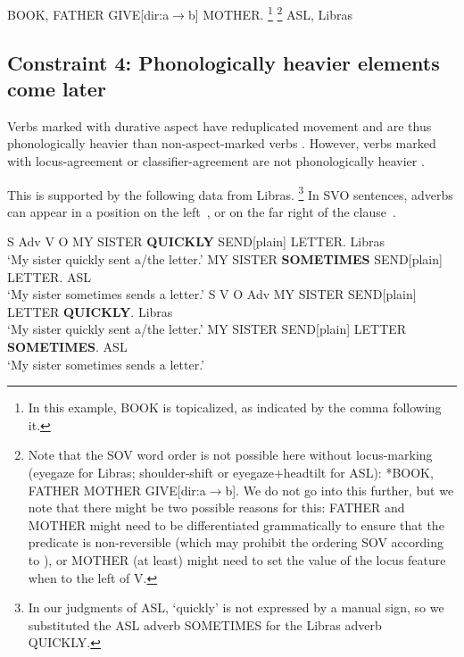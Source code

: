 \documentclass[output=paper,colorlinks,citecolor=brown,
]{langscibook}
\newcommand{\laszDir}[2]{[dir:#1$\to$#2]}
\newcommand{\laszPlain}[0]{[plain]}
\begin{document}
\ea 
    \label{lasz:ex:12}
    BOOK, FATHER GIVE\laszDir{a}{b} MOTHER.%
    \footnote{
        In this example, BOOK is topicalized, as indicated by the comma
        following it.
    }%
    \footnote{
        Note that the SOV word order is not possible here without locus-marking
        (eyegaze for Libras; shoulder-shift or eyegaze+headtilt for ASL):
        \ea 
            *BOOK, FATHER MOTHER GIVE\laszDir{a}{b}.
        \z 
        We do not go into this further, but we note that there might be two possible reasons
        for this: FATHER and MOTHER might need to be differentiated grammatically to
        ensure that the predicate is non-reversible (which may prohibit the ordering SOV
        according to \citealp{Fischer.1974}), or MOTHER (at least) might need to set the value of the
        locus feature when to the left of V.
    }
    \hfill 
    \cmark ASL,
    \cmark Libras 
    \\
\z 

\subsection*{Constraint 4: Phonologically heavier elements come later}

Verbs marked with durative aspect have reduplicated movement
\citep{Klima.Bellugi.1979} and are thus phonologically heavier than
non-aspect-marked verbs \citep{Brentari.1998}. However, verbs marked
with locus-agreement or classifier-agreement are not phonologically
heavier \citep{Brentari.1998}.

This is supported by the following data from Libras.%
\footnote{
    In our judgments of ASL, `quickly' is not expressed by a manual sign, so
    we substituted the ASL adverb SOMETIMES for the Libras adverb QUICKLY.
}
In SVO sentences, adverbs can appear in a position on the left~, or on the
far right of the clause~.

\ea 
    \label{lasz:ex:13}
     S Adv V O
    \ea 
        MY SISTER \textbf{QUICKLY} SEND\laszPlain{} LETTER.
        \hfill 
        \cmark Libras
        \\
         ‘My sister quickly sent a/the letter.’
    \ex 
        MY SISTER \textbf{SOMETIMES} SEND\laszPlain{} LETTER. 
        \hfill 
        \cmark ASL 
        \\ 
        ‘My sister sometimes sends a letter.’
    \z 
\ex 
    \label{lasz:ex:14}
    S V O Adv
    \ea 
        MY SISTER SEND\laszPlain{} LETTER \textbf{QUICKLY}.
        \hfill 
        \cmark Libras 
        \\ 
        ‘My sister quickly sent a/the letter.’
    \ex 
        MY SISTER SEND\laszPlain{} LETTER \textbf{SOMETIMES}.
        \hfill 
        \cmark ASL 
        \\ 
        ‘My sister sometimes sends a letter.’
    \z 
\z 
\end{document}
